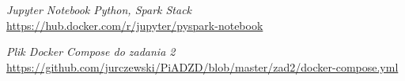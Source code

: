 \documentclass{classrep}
\begin{document}

\nocite{*}
\begin{thebibliography}{0}
    
    \textsl{Jupyter Notebook Python, Spark Stack}
    \url{https://hub.docker.com/r/jupyter/pyspark-notebook}

    \textsl{Plik Docker Compose do zadania 2}
    \url{https://github.com/jurczewski/PiADZD/blob/master/zad2/docker-compose.yml}

    
\end{thebibliography}
\end{document}
